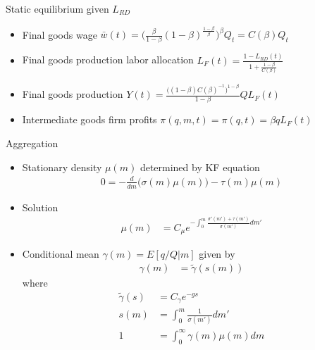 \documentclass[english,usenames,dvipsnames]{beamer}
\begin{document}
\begin{frame}{Static equilibrium given $L_{RD}$}\label{static_eq_conditions}
\hyperlink{closing_the_model}{}
\begin{itemize}
	\item Final goods wage $\bar{w}(t) = \Big(\frac{\beta}{1-\beta} (1-\beta)^{\frac{1-\beta}{\beta}} \Big)^{\beta} Q_t = C(\beta) Q_t$
	\item Final goods production labor allocation $L_F(t) = \frac{1 - L_{RD}(t)}{1 + \frac{1-\beta}{C(\beta)}}$
	\item Final goods production $Y(t) = \frac{\Big((1-\beta)C(\beta)^{-1}\Big)^{1-\beta}}{1-\beta} Q L_F(t)$
	\item Intermediate goods firm profits $\pi(q,m,t) = \pi(q,t) = \beta q L_F(t)$ 
\end{itemize}
\end{frame}

\begin{frame}{Aggregation}\label{aggregation}
\hyperlink{closing_the_model}{}
\begin{itemize}
\item Stationary density $\mu(m)$ determined by KF equation
\begin{align*}
0 = - \frac{d}{dm} \Big( \sigma(m) \mu(m) \Big) - \tau(m) \mu(m)
\end{align*}
\item Solution
\begin{align*}
\mu(m) &= C_\mu e^{-\int_0^m \frac{\sigma'(m') + \tau(m')}{\sigma(m')}dm'} 
\end{align*}
\item Conditional mean $\gamma(m) = E[q/Q | m]$ given by 
\begin{align*}
\gamma(m) &= \tilde{\gamma}(s(m))
\end{align*}
where
\begin{align*}
\tilde{\gamma}(s) &= C_{\gamma} e^{-gs} \\
s(m) &= \int_0^m \frac{1}{\sigma(m')} dm' \\
1 &= \int_0^{\infty} \gamma(m) \mu(m) dm
\end{align*}
\end{itemize}
\end{frame}
\end{document}
